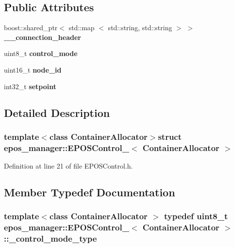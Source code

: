 \subsection*{\-Public \-Attributes}
\begin{DoxyCompactItemize}
\item 
boost\-::shared\-\_\-ptr$<$ std\-::map\*
$<$ std\-::string, std\-::string $>$ $>$ {\bf \-\_\-\-\_\-connection\-\_\-header}
\item 
uint8\-\_\-t {\bf control\-\_\-mode}
\item 
uint16\-\_\-t {\bf node\-\_\-id}
\item 
int32\-\_\-t {\bf setpoint}
\end{DoxyCompactItemize}


\subsection{\-Detailed \-Description}
\subsubsection*{template$<$class Container\-Allocator$>$struct epos\-\_\-manager\-::\-E\-P\-O\-S\-Control\-\_\-$<$ Container\-Allocator $>$}



\-Definition at line 21 of file \-E\-P\-O\-S\-Control.\-h.



\subsection{\-Member \-Typedef \-Documentation}
\subsubsection[{\-\_\-control\-\_\-mode\-\_\-type}]{\setlength{\rightskip}{0pt plus 5cm}template$<$class Container\-Allocator $>$ typedef uint8\-\_\-t {\bf epos\-\_\-manager\-::\-E\-P\-O\-S\-Control\-\_\-}$<$ \-Container\-Allocator $>$\-::{\bf \-\_\-control\-\_\-mode\-\_\-type}}\label{structepos__manager_1_1EPOSControl___a32ab4db9bb71bae608b93a512f540f74}


